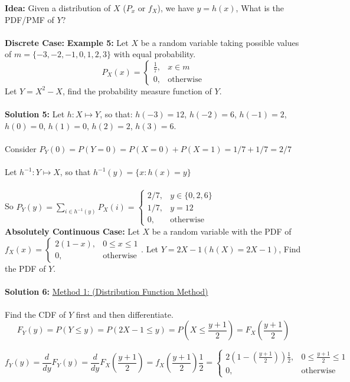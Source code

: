 \documentclass[12pt, twoside]{article}
\begin{document}
\textbf{Idea:} Given a distribution of $X$ ($P_x$ or $f_X$), we have $y = h(x)$, What is the PDF/PMF of $Y$?\\
\\
\textbf{Discrete Case:} \textbf{Example 5:} Let $X$ be a random variable taking possible values of $m = \{ -3, -2, -1, 0, 1, 2, 3 \}$ with equal probability.
$$P_X (x) = \begin{cases}
	\frac{1}{7}, & x\in m\\
	0, & \text{otherwise}
\end{cases}
$$
Let $Y = X^2 - X$, find the probability measure function of $Y$.\\
\\
\textbf{Solution 5:} Let $h : X \mapsto Y$, so that: $h(-3) = 12$, $h(-2) = 6$, $h(-1) = 2$, $h(0) = 0$, $h(1) = 0$, $h(2) = 2$, $h(3) = 6$.\\
\\
Consider $P_Y (0) = P(Y = 0) = P(X = 0) + P(X = 1) = 1/7 + 1/7 = 2/7$\\
\\
Let $h^{-1} : Y \mapsto X$, so that $h^{-1} (y) = \{ x : h(x) = y \}$\\
\\
So $P_Y (y) = \sum_{i \in h^{-1} (y)} P_X (i) = \begin{cases}
	2/7, & y \in \{ 0,2,6 \}\\
	1/7, & y = 12\\
	0, & \text{otherwise}
\end{cases}
$
\\
\textbf{Absolutely Continuous Case:}  Let $X$ be a random variable with the PDF of $f_X (x) = \begin{cases}
	2(1-x), & 0 \leq x \leq 1\\
	0, & \text{otherwise}
\end{cases}
$. Let $Y = 2X - 1 (h(X) = 2X - 1)$, Find the PDF of $Y$.\\
\\
\textbf{Solution 6:} \underline{Method 1: (Distribution Function Method)}\\
\\
Find the CDF of $Y$ first and then differentiate.
$$F_Y (y) = P(Y \leq y) = P(2X - 1 \leq y) = P(X \leq \frac{y+1}{2}) = F_X (\frac{y+1}{2})$$

$$f_Y (y) = \frac{d}{dy} F_Y (y) = \frac{d}{dy} F_X (\frac{y+1}{2}) = f_X (\frac{y+1}{2}) \frac{1}{2} = \begin{cases}
	2(1 - (\frac{y+1}{2}))\frac{1}{2}, & 0 \leq \frac{y+1}{2} \leq 1\\
	0, & \text{otherwise}
\end{cases}
$$
\end{document}
